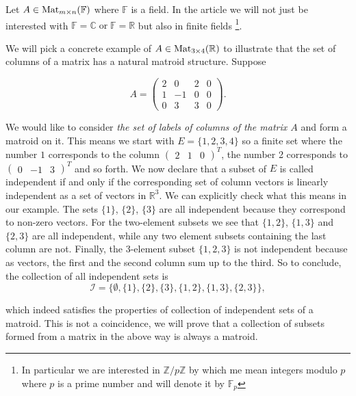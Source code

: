  Let $A \in \text{Mat}_{m \times n}(\mathbb{F})$ where $\mathbb{F}$ is a field. In the article we will not just be interested with $\mathbb{F} = \mathbb{C} \; \mathrm{or}\; \mathbb{F} = \mathbb{R} $ but also in finite fields 
 \footnote{In particular we are interested in $\mathbb{Z} / p\mathbb{Z}$ by which me mean integers modulo $p$ where $p$ is a prime number and will denote it by $\mathbb{F}_p$}.

\begin{exmp}
    

 
 We will pick a concrete example of $A \in  \text{Mat}_{3 \times 4}(\mathbb{R})$ to illustrate that the set of columns of a matrix has a natural matroid structure. Suppose

$$A = \begin{pmatrix}

2 & 0 & 2 & 0 \\
1 & -1 & 0 & 0 \\
0 & 3 & 3 & 0


\end{pmatrix}.$$

We would like to consider \textit{the set of labels of columns of the matrix $A$} and form a matroid on it. This means we start with $E = \{1,2,3,4\}$ so a finite set where the number $1$ corresponds to the column $\begin{pmatrix} 2 & 1 & 0 \end{pmatrix} ^ T$, the number 2 corresponds to $\begin{pmatrix}  0 & -1 & 3  \end{pmatrix} ^ T$ and so forth. We now declare that a subset of $E$ is called independent if and only if the corresponding set of column vectors is linearly independent as a set of vectors in $\mathbb{R}^3$. We can explicitly check what this means in our example. The sets $\{1\}$, $\{2\}$, $\{3\}$ are all independent because they correspond to non-zero vectors. For the two-element subsets we see that $\{1,2\}$, $\{1,3\}$ and $\{2,3\}$ are all independent, while any two element subsets containing the last column are not. Finally, the 3-element subset $\{1,2,3\}$ is not independent because as vectors, the first and the second column sum up to the third. So to conclude, the collection of all independent sets is
$$\mathcal{I} = \{\emptyset, \{1\}, \{2\}, \{3\}, \{1,2\}, \{1,3\}, \{2,3\} \},$$

which indeed satisfies the properties of collection of independent sets of a matroid. This is not a coincidence, we will prove that a collection of subsets formed from a matrix in the above way is always a matroid.

\end{exmp}



